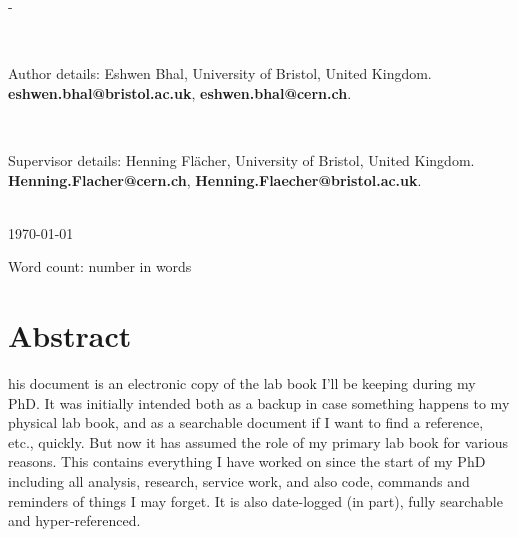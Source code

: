 \documentclass[a4paper,12pt,leqno,openbib,oldfontcommands,oneside]{memoir} %
\begin{document}
\begin{titlingpage}
\begin{SingleSpace}
\begin{adjustwidth*}{\unitlength}{-\unitlength}
\begin{center}
\begin{minipage}{10cm}
  \

  Author details: Eshwen Bhal, University of Bristol, United Kingdom. \textbf{eshwen.bhal@bristol.ac.uk}, \textbf{eshwen.bhal@cern.ch}.

  \

  Supervisor details: Henning Fl\"{a}cher, University of Bristol, United Kingdom. \textbf{Henning.Flacher@cern.ch}, \textbf{Henning.Flaecher@bristol.ac.uk}.
  \end{minipage}\\
  \vspace{9mm}
  {\large\textsc{\today}}  %
  \vspace{12mm}
  \end{center}
  \begin{flushright}
  {\small Word count: number in words}  %
  \end{flushright}
  \end{adjustwidth*}
  \end{SingleSpace}
\end{titlingpage}

\chapter*{Abstract}
\begin{SingleSpace}
his document is an electronic copy of the lab book I'll be keeping during my PhD. It was initially intended both as a backup in case something happens to my physical lab book, and as a searchable document if I want to find a reference, etc., quickly. But now it has assumed the role of my primary lab book for various reasons. This contains everything I have worked on since the start of my PhD including all analysis, research, service work, and also code, commands and reminders of things I may forget. It is also date-logged (in part), fully searchable and hyper-referenced.
\end{SingleSpace}
\clearpage

\renewcommand{\contentsname}{Table of Contents}
\tableofcontents*
{}
\clearpage

\listoffigures
{}
\clearpage

\listoftables
{}
\clearpage
\end{document}
